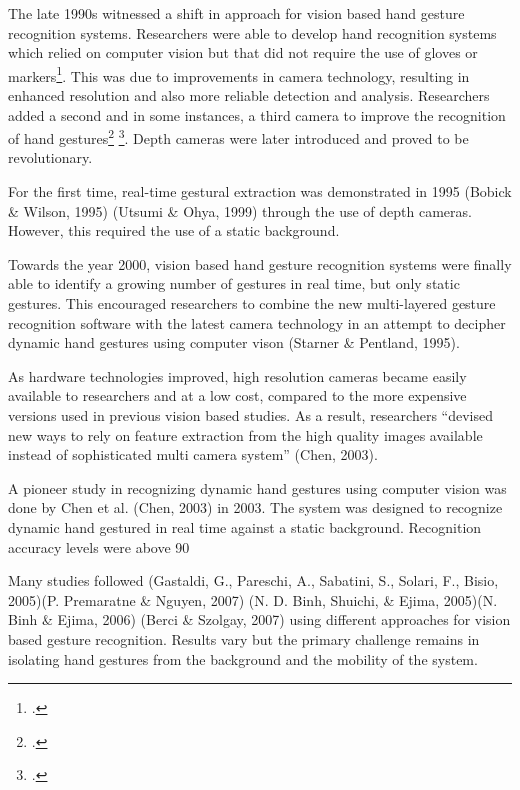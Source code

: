 The late 1990s witnessed a shift in approach for vision based hand gesture recognition systems. Researchers were able to develop hand recognition systems which relied on computer vision but that did not require the use of gloves or markers\footcite{Rehg1994}. This was due to improvements in camera technology, resulting in enhanced resolution and also more reliable detection and analysis. Researchers added a second and in some instances, a third camera to improve the recognition of hand gestures\footcite{Gennery1992} \footcite{Darrell1993}. Depth cameras were later introduced and proved to be revolutionary. 

For the first time, real-time gestural extraction was demonstrated in 1995 (Bobick \& Wilson, 1995) (Utsumi \& Ohya, 1999) through the use of depth cameras. However, this required the use of a static background.  

Towards the year 2000, vision based hand gesture recognition systems were finally able to identify a growing number of gestures in real time, but only static gestures. This encouraged researchers to combine the new multi-layered gesture recognition software with the latest camera technology in an attempt to decipher dynamic hand gestures using computer vison (Starner \& Pentland, 1995). 

As hardware technologies improved, high resolution cameras became easily available to researchers and at a low cost, compared to the more expensive versions used in previous vision based studies. As a result, researchers ``devised new ways to rely on feature extraction from the high quality images available instead of sophisticated multi camera system'' (Chen, 2003). 

A pioneer study in recognizing dynamic hand gestures using computer vision was done by Chen et al. (Chen, 2003) in 2003. The system was designed to recognize dynamic hand gestured in real time against a static background. Recognition accuracy levels were above 90%

Many studies followed (Gastaldi, G., Pareschi, A., Sabatini, S., Solari, F., Bisio, 2005)(P. Premaratne \& Nguyen, 2007) (N. D. Binh, Shuichi, \& Ejima, 2005)(N. Binh \& Ejima, 2006) (Berci \& Szolgay, 2007) using different approaches for vision based gesture recognition. Results vary but the primary challenge remains in isolating hand gestures from the background and the mobility of the system. 


